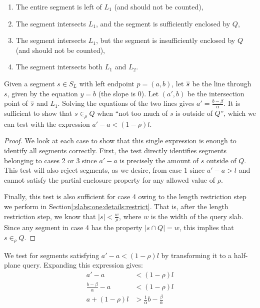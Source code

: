 \begin{enumerate}
 \item The entire segment is left of $L_1$ (and should not be counted),

 \item The segment intersects $L_1$, and the segment is sufficiently enclosed by $Q$,

 \item The segment intersects $L_1$, but the segment is insufficiently enclosed by $Q$ (and should not be counted),

 \item The segment intersects both $L_1$ and $L_2$. 

\end{enumerate}

Given a segment $s \in S_L$ with left endpoint $p = (a,b)$, let $\overline{s}$ be the line through $s$, given by the equation $y = b$ (the slope is 0). 
Let $(a', b)$ be the intersection point of $\overline{s}$ and $L_1$. 
Solving the equations of the two lines gives $a' = \frac{b - \beta}{\alpha}$. 
It is sufficient to show that $s \in_\rho Q$ when ``not too much of $s$ is outside of $Q$'', which we can test with the expression $a' - a < (1 - \rho)l$.

\begin{proof}
We look at each case to show that this single expression is enough to identify all segments correctly. 
First, the test directly identifies segments belonging to cases 2 or 3 since $a' - a$ is precisely the amount of $s$ outside of $Q$. This test will also reject segments, as we desire, from case 1 since $a' - a > l$ and cannot satisfy the partial enclosure property for any allowed value of $\rho$. 

Finally, this test is also sufficient for case 4 owing to the length restriction step we perform in Section\ref{:slabs:one:details:restrict}. That is, after the length restriction step, we know that $|s| < \frac{w}{\rho}$, where $w$ is the width of the query slab. Since any segment in case 4 has the property $|s \cap Q| = w$, this implies that $s \in_\rho Q$.
\end{proof}

We test for segments satisfying $a' - a < (1 - \rho)l$ by transforming it to a half-plane query. Expanding this expression gives:
\[
\begin{split}
a' - a &< (1 - \rho)l \\
%
\frac{b - \beta}{\alpha} - a &< (1 - \rho)l \\
%
a + (1 - \rho)l &> \frac{1}{\alpha} b - \frac{\beta}{\alpha}  \\
\end{split}
\]

